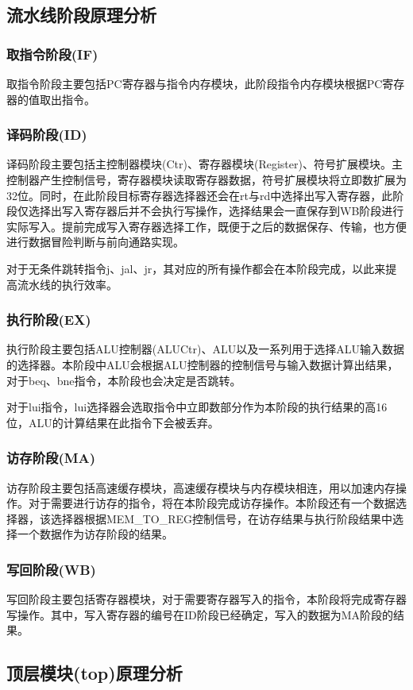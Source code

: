 \documentclass[UTF8]{ctexart}
\begin{document}
\subsection{流水线阶段原理分析}
\subsubsection{取指令阶段(IF)}
    取指令阶段主要包括PC寄存器与指令内存模块，此阶段指令内存模块根据PC寄存器的值取出指令。
\subsubsection{译码阶段(ID)}
    译码阶段主要包括主控制器模块(Ctr)、寄存器模块(Register)、符号扩展模块。主控制器产生控制信号，寄存器模块读取寄存器数据，符号扩展模块将立即数扩展为32位。同时，在此阶段目标寄存器选择器还会在rt与rd中选择出写入寄存器，此阶段仅选择出写入寄存器后并不会执行写操作，选择结果会一直保存到WB阶段进行实际写入。提前完成写入寄存器选择工作，既便于之后的数据保存、传输，也方便进行数据冒险判断与前向通路实现。\par
    对于无条件跳转指令j、jal、jr，其对应的所有操作都会在本阶段完成，以此来提高流水线的执行效率。
\subsubsection{执行阶段(EX)}
    执行阶段主要包括ALU控制器(ALUCtr)、ALU以及一系列用于选择ALU输入数据的选择器。本阶段中ALU会根据ALU控制器的控制信号与输入数据计算出结果，对于beq、bne指令，本阶段也会决定是否跳转。\par
    对于lui指令，lui选择器会选取指令中立即数部分作为本阶段的执行结果的高16位，ALU的计算结果在此指令下会被丢弃。
\subsubsection{访存阶段(MA)}
    访存阶段主要包括高速缓存模块，高速缓存模块与内存模块相连，用以加速内存操作。对于需要进行访存的指令，将在本阶段完成访存操作。本阶段还有一个数据选择器，该选择器根据MEM\_TO\_REG控制信号，在访存结果与执行阶段结果中选择一个数据作为访存阶段的结果。
\subsubsection{写回阶段(WB)}
    写回阶段主要包括寄存器模块，对于需要寄存器写入的指令，本阶段将完成寄存器写操作。其中，写入寄存器的编号在ID阶段已经确定，写入的数据为MA阶段的结果。

\subsection{顶层模块(top)原理分析}\label{sec:design-top}
\end{document}
